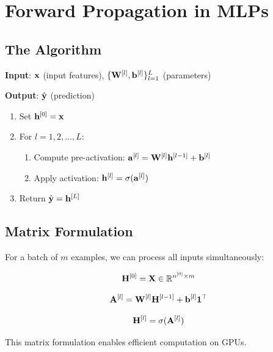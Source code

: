 
\section{Forward Propagation in MLPs}

\subsection{The Algorithm}

\begin{tcolorbox}[title=Forward Propagation Algorithm]
\textbf{Input}: $\mathbf{x}$ (input features), $\{\mathbf{W}^{[l]}, \mathbf{b}^{[l]}\}_{l=1}^{L}$ (parameters)

\textbf{Output}: $\hat{\mathbf{y}}$ (prediction)

\begin{enumerate}
    \item Set $\mathbf{h}^{[0]} = \mathbf{x}$
    \item For $l = 1, 2, \ldots, L$:
    \begin{enumerate}
        \item Compute pre-activation: $\mathbf{a}^{[l]} = \mathbf{W}^{[l]} \mathbf{h}^{[l-1]} + \mathbf{b}^{[l]}$
        \item Apply activation: $\mathbf{h}^{[l]} = \sigma(\mathbf{a}^{[l]})$
    \end{enumerate}
    \item Return $\hat{\mathbf{y}} = \mathbf{h}^{[L]}$
\end{enumerate}
\end{tcolorbox}

\subsection{Matrix Formulation}

For a batch of $m$ examples, we can process all inputs simultaneously:

\[
\mathbf{H}^{[0]} = \mathbf{X} \in \mathbb{R}^{n^{[0]} \times m}
\]

\[
\mathbf{A}^{[l]} = \mathbf{W}^{[l]} \mathbf{H}^{[l-1]} + \mathbf{b}^{[l]} \mathbf{1}^\top
\]

\[
\mathbf{H}^{[l]} = \sigma(\mathbf{A}^{[l]})
\]

This matrix formulation enables efficient computation on GPUs.

